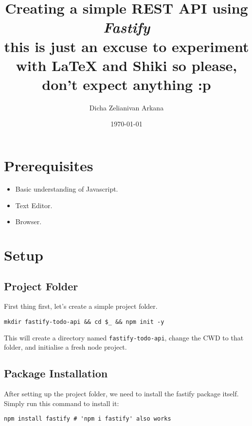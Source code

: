 \documentclass[a4paper,14pt,titlepage]{article}
\title{
  Creating a simple REST API using \textbf{\textit{Fastify}}\\[2ex]
  \small this is just an excuse to experiment with {\LaTeX} and Shiki so
  please, don't expect anything :p
}
\author{Dicha Zelianivan Arkana}
\date{\today}
\def\c#1{\texttt{#1}}
\begin{document}
\setlength{\parindent}{0pt}


\maketitle\newpage

\renewcommand{\contentsname}{Table of Contents}
\tableofcontents\newpage

\section{Prerequisites}

\begin{itemize}
  \item Basic understanding of Javascript.
  \item Text Editor.
  \item Browser.
\end{itemize}

\section{Setup}
\subsection{Project Folder}

First thing first, let's create a simple project folder.

\begin{verbatim}
mkdir fastify-todo-api && cd $_ && npm init -y
\end{verbatim}

This will create a directory named \c{fastify-todo-api}, change the CWD
to that folder, and initialise a fresh node project.

\subsection{Package Installation}

After setting up the project folder, we need to install the fastify package
itself. Simply run this command to install it:

\begin{verbatim}
npm install fastify # 'npm i fastify' also works
\end{verbatim}
\end{document}
